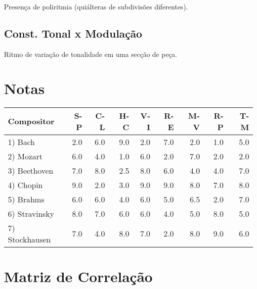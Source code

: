 \documentclass[11pt]{article}
\begin{document}
Presença de poliritmia (quiálteras de subdivisões diferentes).
\subsection{Const. Tonal x Modulação}
\label{sec-1_8}

Ritmo de variação de tonalidade em uma secção de peça.
\section{Notas}
\label{sec-2}



\begin{center}
\begin{tabular}{lrrrrrrrr}
 Compositor      &  S-P  &  C-L  &  H-C  &  V-I  &  R-E  &  M-V  &  R-P  &  T-M  \\
\hline
 1) Bach         &  2.0  &  6.0  &  9.0  &  2.0  &  7.0  &  2.0  &  1.0  &  5.0  \\
 2) Mozart       &  6.0  &  4.0  &  1.0  &  6.0  &  2.0  &  7.0  &  2.0  &  2.0  \\
 3) Beethoven    &  7.0  &  8.0  &  2.5  &  8.0  &  6.0  &  4.0  &  4.0  &  7.0  \\
 4) Chopin       &  9.0  &  2.0  &  3.0  &  9.0  &  9.0  &  8.0  &  7.0  &  8.0  \\
 5) Brahms       &  6.0  &  6.0  &  4.0  &  6.0  &  5.0  &  6.5  &  2.0  &  7.0  \\
 6) Stravinsky   &  8.0  &  7.0  &  6.0  &  6.0  &  4.0  &  5.0  &  8.0  &  5.0  \\
 7) Stockhausen  &  7.0  &  4.0  &  8.0  &  7.0  &  2.0  &  8.0  &  9.0  &  6.0  \\
\end{tabular}
\end{center}
\section{Matriz de Correlação}
\label{sec-3}
\end{document}

